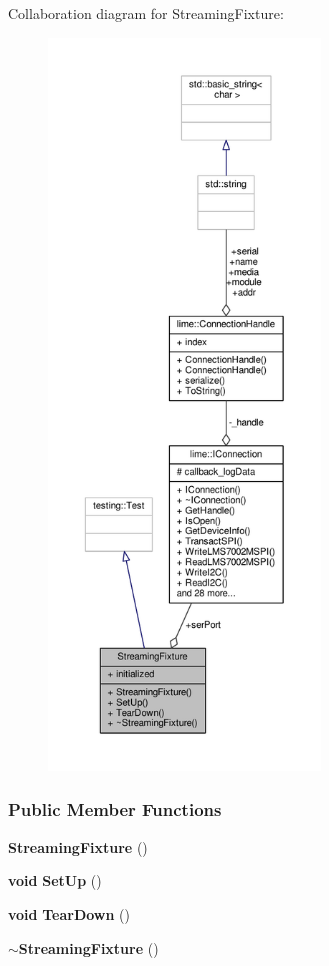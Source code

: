 Collaboration diagram for Streaming\+Fixture\+:
\nopagebreak
\begin{figure}[H]
\begin{center}
\leavevmode
\includegraphics[height=550pt]{d1/df2/classStreamingFixture__coll__graph}
\end{center}
\end{figure}
\subsubsection*{Public Member Functions}
\begin{DoxyCompactItemize}
\item 
{\bf Streaming\+Fixture} ()
\item 
{\bf void} {\bf Set\+Up} ()
\item 
{\bf void} {\bf Tear\+Down} ()
\item 
{\bf $\sim$\+Streaming\+Fixture} ()
\end{DoxyCompactItemize}
